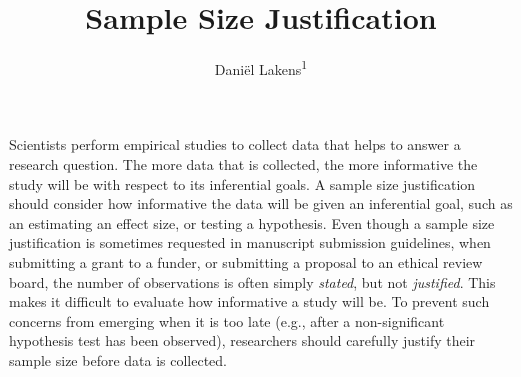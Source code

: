 \documentclass[
  english,
  ,jou, a4paper,floatsintext]{apa6}
\title{Sample Size Justification}
\author{Daniël Lakens\textsuperscript{1}}
\date{}
\affiliation{\vspace{0.5cm}\textsuperscript{1} Eindhoven University of Technology}
\begin{document}
\maketitle

Scientists perform empirical studies to collect data that helps to answer a research question. The more data that is collected, the more informative the study will be with respect to its inferential goals. A sample size justification should consider how informative the data will be given an inferential goal, such as an estimating an effect size, or testing a hypothesis. Even though a sample size justification is sometimes requested in manuscript submission guidelines, when submitting a grant to a funder, or submitting a proposal to an ethical review board, the number of observations is often simply \emph{stated}, but not \emph{justified}. This makes it difficult to evaluate how informative a study will be. To prevent such concerns from emerging when it is too late (e.g., after a non-significant hypothesis test has been observed), researchers should carefully justify their sample size before data is collected.
\end{document}
